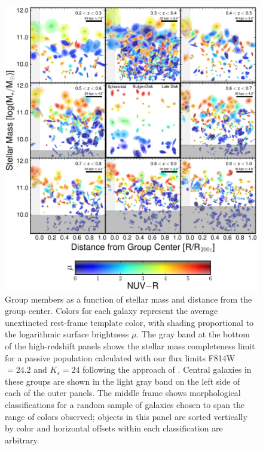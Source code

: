 \begin{figure}[htb]
\begin{center}
\includegraphics[scale=0.7]{transformers/fig1.pdf}
\caption{Group members as a function of stellar mass and distance from
  the group center. Colors for each galaxy represent the average
  unextincted rest-frame template \nuvr color, with shading
  proportional to the logarithmic surface brightness $\mu$. The gray
  band at the bottom of the high-redshift panels shows the stellar
  mass completeness limit for a passive population calculated with our
  flux limits F814W $ = 24.2$ and $K_s=24$ following the approach of
  \citet{Bundy2010} \citep[see also Figure 1
  of][]{George2011}. Central galaxies in these groups are shown in the
  light gray band on the left side of each of the outer panels. The
  middle frame shows morphological classifications for a random sample
  of galaxies chosen to span the range of colors observed; objects in
  this panel are sorted vertically by color and horizontal offsets
  within each classification are arbitrary.}
\label{tran_fig:candy}
\end{center}
\end{figure}
 
